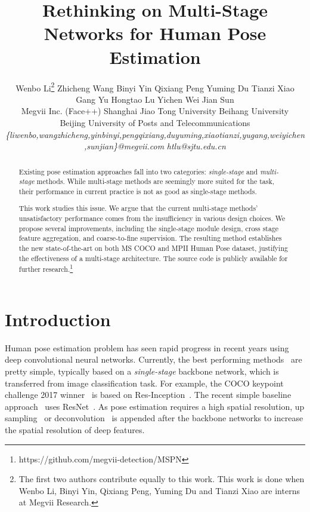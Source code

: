 \documentclass[10pt,twocolumn,letterpaper]{article}
\begin{document}
\title{Rethinking on Multi-Stage Networks for Human Pose Estimation}

\author{
	Wenbo Li\thanks{The first two authors contribute equally to this work. This work is done when Wenbo Li, Binyi Yin, Qixiang Peng, Yuming Du and Tianzi Xiao are interns at Megvii Research.} \quad Zhicheng Wang \quad Binyi Yin \quad Qixiang Peng \quad Yuming Du \quad Tianzi Xiao \quad Gang Yu \quad Hongtao Lu \quad Yichen Wei \quad Jian Sun \vspace{0.10cm} \\
	Megvii Inc. (Face++)   
	Shanghai Jiao Tong University
	Beihang University \\
	Beijing University of Posts and Telecommunications \\
	\textit{\{liwenbo,wangzhicheng,yinbinyi,pengqixiang,duyuming,xiaotianzi,yugang,weiyichen,sunjian\}@megvii.com}
	 \textit{htlu@sjtu.edu.cn}
}

\maketitle



\begin{abstract}
	Existing pose estimation approaches fall into two categories: \emph{single-stage} and \emph{multi-stage} methods. While multi-stage methods are seemingly more suited for the task, their performance in current practice is not as good as single-stage methods.
	
	This work studies this issue. We argue that the current multi-stage methods' unsatisfactory performance comes from the insufficiency in various design choices. We propose several improvements, including the single-stage module design, cross stage feature aggregation, and coarse-to-fine supervision. The resulting method establishes the new state-of-the-art on both MS COCO and MPII Human Pose dataset, justifying the effectiveness of a multi-stage architecture. The source code is publicly available for further research.\footnote{https://github.com/megvii-detection/MSPN}
\end{abstract}

\section{Introduction}
Human pose estimation problem has seen rapid progress in recent years using deep convolutional neural networks. Currently, the best performing methods~\cite{papandreou2017towards,he2017mask,chen2018cascaded,xiao2018simple} are pretty simple, typically based on a \emph{single-stage} backbone network, which is transferred from image classification task. For example, the COCO keypoint challenge 2017 winner~\cite{chen2018cascaded} is based on Res-Inception~\cite{szegedy2017inception}. The recent simple baseline approach~\cite{xiao2018simple} uses ResNet~\cite{he2016deep}. As pose estimation requires a high spatial resolution, up sampling~\cite{chen2018cascaded} or deconvolution~\cite{xiao2018simple} is appended after the backbone networks to increase the spatial resolution of deep features.
\end{document}
